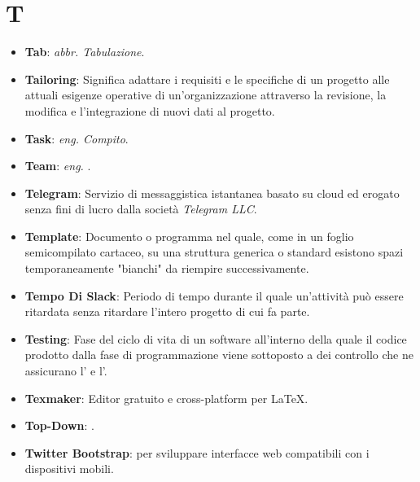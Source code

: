 \section*{T}
\begin{itemize}
	\item
	\textbf{Tab}: \textit{abbr. Tabulazione}.
	\item
	\textbf{Tailoring}: Significa adattare i requisiti e le specifiche di un progetto alle attuali esigenze operative di un'organizzazione attraverso la revisione, la modifica e l'integrazione di nuovi dati al progetto.
	\item
	\textbf{Task}: \textit{eng. Compito}.
	\item
	\textbf{Team}: \textit{eng. }.
	\item
	\textbf{Telegram}: Servizio di messaggistica istantanea basato su cloud ed erogato senza fini di lucro dalla società \textit{Telegram LLC}.
	\item
	\textbf{Template}: Documento o programma nel quale, come in un foglio semicompilato cartaceo, su una struttura generica o standard esistono spazi temporaneamente "bianchi" da riempire successivamente.
	\item
	\textbf{Tempo Di Slack}: Periodo di tempo durante il quale un'attività può essere ritardata senza ritardare l'intero progetto di cui fa parte.
	\item
	\textbf{Testing}: Fase del ciclo di vita di un software all'interno della quale il codice prodotto dalla fase di programmazione viene sottoposto a dei controllo che ne assicurano l' e l'.
	\item
	\textbf{Texmaker}: Editor gratuito e cross-platform per LaTeX.
	\item
	\textbf{Top-Down}: .
	\item
	\textbf{Twitter Bootstrap}:  per sviluppare interfacce web compatibili con i dispositivi mobili.
\end{itemize}
\newpage